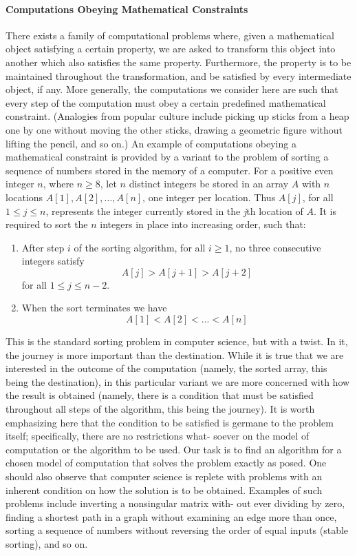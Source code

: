 \documentclass[12pt,a4paper]{report}
\begin{document}
\paragraph{Computations Obeying Mathematical Constraints}
There exists a family of computational problems where, given a mathematical object satisfying a certain property, we are asked to transform this object into another which also satisfies the same property. Furthermore, the property is to be maintained throughout the transformation, and be satisfied by every intermediate object, if any. More generally, the computations we consider here are such that every step of the computation must obey a certain predefined mathematical constraint. (Analogies from popular culture include picking up sticks from a heap one by one without moving the other sticks, drawing a geometric figure without lifting the pencil, and so on.) An example of computations obeying a mathematical constraint is provided by a variant to the problem of sorting a sequence of numbers stored in the memory of a computer. For a positive even integer $n$, where $n \geq 8$, let $n$ distinct integers be stored in an array $A$ with $n$ locations $A[1], A[2], . . . , A[n]$, one integer per location. Thus $A[j]$, for all $1 \leq j \leq n$, represents the integer currently stored in the \textit{j}th location of $A$. It is required to sort the $n$ integers in place into increasing order, such that:
\begin{enumerate}
\item After step $i$ of the sorting algorithm, for all $i \geq 1$, no three consecutive integers satisfy
\begin{equation}
A[j] > A[j+1] > A[j+2]
\end{equation}
for all $1 \leq j \leq n - 2$.
\item When the sort terminates we have
\begin{equation}
A[1] < A[2] < ... < A[n]
\end{equation}
\end{enumerate}
This is the standard sorting problem in computer science, but with a twist. In it, the journey is more important than the destination. While it is true that we are interested in the outcome of the computation (namely, the sorted array, this being the destination), in this particular variant we are more concerned with how the result is obtained (namely, there is a condition that must be satisfied throughout all steps of the algorithm, this being the journey). It is worth emphasizing here that the condition to be satisfied is germane to the problem itself; specifically, there are no restrictions what- soever on the model of computation or the algorithm to be used. Our task is to find an algorithm for a chosen model of computation that solves the problem exactly as posed. One should also observe that computer science is replete with problems with an inherent condition on how the solution is to be obtained. Examples of such problems include inverting a nonsingular matrix with- out ever dividing by zero, finding a shortest path in a graph without examining an edge more than once, sorting a sequence of numbers without reversing the order of equal inputs (stable sorting), and so on.
\end{document}
